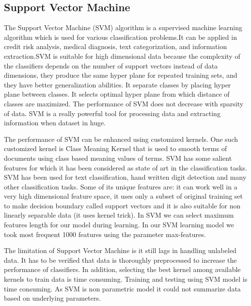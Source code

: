 \documentclass[12pt,a4paper]{report}
\begin{document}
\subsection{Support Vector Machine}
The Support Vector Machine (SVM) algorithm is a supervised machine learning algorithm which is used for various classification problems.It can be applied in credit risk analysis, medical diagnosis, text categorization, and information extraction.SVM is suitable for high dimensional data because the complexity of the classifiers depends on the number
of support vectors instead of data dimensions, they produce the same hyper plane for repeated training sets, and they have better generalization abilities. It separate classes by placing hyper plane between classes. It selects optimal hyper plane from which distance of classes are maximized. The performance of SVM does not decrease with sparsity of data. SVM is a really powerful tool for processing data and extracting information when dataset in huge.
\par 
\vspace{0.5cm}
The performance of SVM can be enhanced using customized kernels. One such customized kernel is Class Meaning Kernel that is used to smooth terms of documents using class based meaning values of terms. SVM has some salient features for which it has been considered as state of art in the classification tasks. SVM has been used for text classification, hand written digit detection and many other classification tasks. Some of its unique features are: it can work well in a very high dimensional feature space, it uses only a subset of original training set to make decision boundary called support vectors and it is also suitable for non linearly separable data (it uses kernel trick). In SVM we can select maximum features length for our model during learning. In our SVM learning model we took most frequent 1000 features using the parameter max-features.  
\par 
\vspace{0.5cm}
The limitation of Support Vector Machine is it still lags in handling unlabeled data. It has to be verified that data is thoroughly preprocessed to increase the performance of classifiers. In addition, selecting the best kernel among available kernels to train data is time consuming. Training and testing using SVM model is time consuming. As SVM is non parametric model it could not summarize data based on underlying parameters. 
\clearpage
\end{document}
